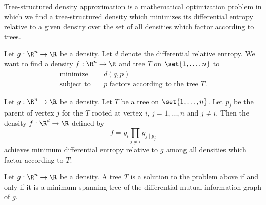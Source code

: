 


Tree-structured density
approximation is a mathematical
optimization problem in which we
find a tree-structured density
which minimizes its differential entropy relative
to a given density over the set
of all densities which factor
according to trees.


Let $g: \R^n \to \R$ be a density.
Let $d$ denote the differential
relative entropy.  We want to find a density $f: \R^n \to \R$
and tree $T$ on
$\set{1, \dots, n}$ to
\[
  \begin{aligned}
    \text{minimize}   &\quad d(q, p) \\
    \text{subject to} &\quad p \text{ factors according to the tree } T.
  \end{aligned}
\]


\begin{prop}
  Let $g: \R^n \to \R$ be a density.
  Let $T$ be
  a tree on $\set{1, \dots, n}$.
  Let $p_j$ be
  the parent of vertex $j$ for the $T$ rooted
  at vertex $i$, $j = 1,\dots,n$ and $j \neq i$.
  Then the density $f: \R^d \to \R$ defined by
  \[
    f = g_i \prod_{j \neq i} g_{j \mid p_j}
  \]
  achieves minimum differential entropy relative to $g$ among
  all densities which factor according to $T$.
\end{prop}

\begin{prop}
  Let $g: \R^n \to \R$ be a density.
  A tree $T$ is a solution to the problem above
  if and only if it is a minimum spanning
  tree of the differential mutual information graph of $g$.
\end{prop}

